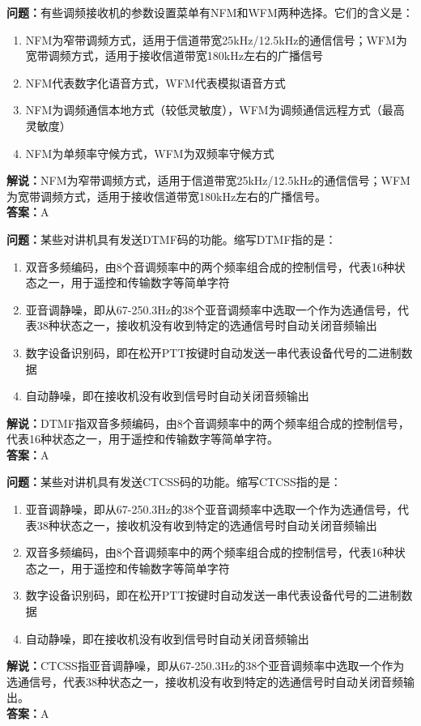 \documentclass{ctexbook}%
\begin{document}
\textbf{问题：}有些调频接收机的参数设置菜单有NFM和WFM两种选择。它们的含义是：
\begin{enumerate}[label=\Alph*), leftmargin=3em]
\item NFM为窄带调频方式，适用于信道带宽25kHz/12.5kHz的通信信号；WFM为宽带调频方式，适用于接收信道带宽180kHz左右的广播信号
\item NFM代表数字化语音方式，WFM代表模拟语音方式
\item NFM为调频通信本地方式（较低灵敏度），WFM为调频通信远程方式（最高灵敏度）
\item NFM为单频率守候方式，WFM为双频率守候方式
\end{enumerate}
\textbf{解说：}NFM为窄带调频方式，适用于信道带宽25kHz/12.5kHz的通信信号；WFM为宽带调频方式，适用于接收信道带宽180kHz左右的广播信号。\\
\textbf{答案：}A

\textbf{问题：}某些对讲机具有发送DTMF码的功能。缩写DTMF指的是：
\begin{enumerate}[label=\Alph*), leftmargin=3em]
\item 双音多频编码，由8个音调频率中的两个频率组合成的控制信号，代表16种状态之一，用于遥控和传输数字等简单字符
\item 亚音调静噪，即从67-250.3Hz的38个亚音调频率中选取一个作为选通信号，代表38种状态之一，接收机没有收到特定的选通信号时自动关闭音频输出
\item 数字设备识别码，即在松开PTT按键时自动发送一串代表设备代号的二进制数据
\item 自动静噪，即在接收机没有收到信号时自动关闭音频输出
\end{enumerate}
\textbf{解说：}DTMF指双音多频编码，由8个音调频率中的两个频率组合成的控制信号，代表16种状态之一，用于遥控和传输数字等简单字符。\\
\textbf{答案：}A

\textbf{问题：}某些对讲机具有发送CTCSS码的功能。缩写CTCSS指的是：
\begin{enumerate}[label=\Alph*), leftmargin=3em]
\item 亚音调静噪，即从67-250.3Hz的38个亚音调频率中选取一个作为选通信号，代表38种状态之一，接收机没有收到特定的选通信号时自动关闭音频输出
\item 双音多频编码，由8个音调频率中的两个频率组合成的控制信号，代表16种状态之一，用于遥控和传输数字等简单字符
\item 数字设备识别码，即在松开PTT按键时自动发送一串代表设备代号的二进制数据
\item 自动静噪，即在接收机没有收到信号时自动关闭音频输出
\end{enumerate}
\textbf{解说：}CTCSS指亚音调静噪，即从67-250.3Hz的38个亚音调频率中选取一个作为选通信号，代表38种状态之一，接收机没有收到特定的选通信号时自动关闭音频输出。\\
\textbf{答案：}A
\end{document}
